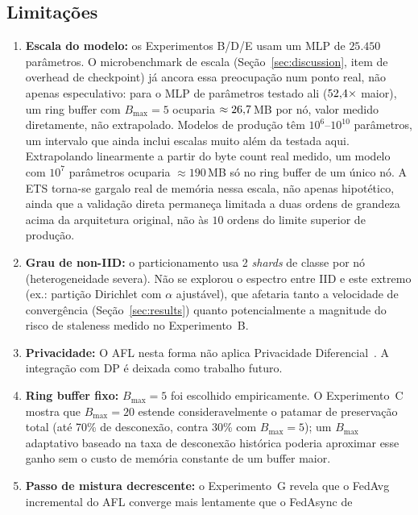 \documentclass[conference,a4paper]{IEEEtran}
\begin{document}
\subsection{Limitações}

\begin{enumerate}[noitemsep,leftmargin=*]
  \item \textbf{Escala do modelo:} os Experimentos B/D/E usam um MLP de
    $25{.}450$ parâmetros. O microbenchmark de escala (Seção~\ref{sec:discussion},
    item de overhead de checkpoint) já ancora essa preocupação num ponto
    real, não apenas especulativo: para o MLP de \statScaleLargeParams{}
    parâmetros testado ali ($52{,}4\times$ maior), um ring buffer com
    $B_{\max}=5$ ocuparia $\approx26{,}7$\,MB por nó,
    valor medido diretamente, não extrapolado. Modelos de produção têm
    $10^6$--$10^{10}$ parâmetros, um intervalo que ainda inclui escalas
    muito além da testada aqui. Extrapolando linearmente a partir do byte
    count real medido, um modelo com $10^7$ parâmetros ocuparia
    $\approx 190$\,MB só no ring buffer de um único nó. A ETS torna-se
    gargalo real de memória nessa escala, não apenas hipotético, ainda que
    a validação direta permaneça limitada a duas ordens de grandeza acima
    da arquitetura original, não às $10$ ordens do limite superior de
    produção.
  \item \textbf{Grau de non-IID:} o particionamento usa 2 \textit{shards}
    de classe por nó (heterogeneidade severa). Não se explorou o espectro
    entre IID e este extremo (ex.: partição Dirichlet com $\alpha$
    ajustável), que afetaria tanto a velocidade de convergência
    (Seção~\ref{sec:results}) quanto potencialmente a magnitude do risco de
    staleness medido no Experimento~B.
  \item \textbf{Privacidade:} O AFL nesta forma não aplica Privacidade
    Diferencial~\cite{dwork2014}. A integração com DP é deixada como
    trabalho futuro.
  \item \textbf{Ring buffer fixo:} $B_{\max}=5$ foi escolhido empiricamente.
    O Experimento~C mostra que $B_{\max}=20$ estende consideravelmente o
    patamar de preservação total (até 70\% de desconexão, contra 30\% com
    $B_{\max}=5$); um $B_{\max}$ adaptativo baseado na taxa de desconexão
    histórica poderia aproximar esse ganho sem o custo de memória constante
    de um buffer maior.
  \item \textbf{Passo de mistura decrescente:} o Experimento~G revela que
    o FedAvg incremental do AFL converge mais lentamente que o FedAsync de

\end{enumerate}
\end{document}
